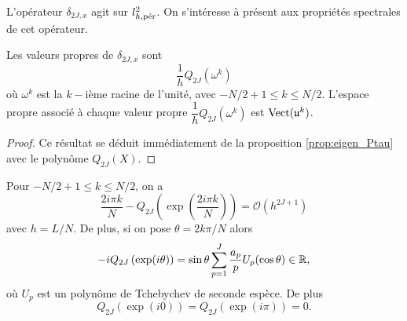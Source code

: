L'opérateur $\delta_{2J,x}$ agit sur $l^2_{h,\per}$. On s'intéresse à présent aux propriétés spectrales de cet opérateur.
\begin{proposition}
Les valeurs propres de $\delta_{2J,x}$ sont
\begin{equation}
\dfrac{1}{h}Q_{2J}(\omega^k)
\end{equation}
où $\omega^k$ est la $k-$ième racine de l'unité, avec $-N/2+1 \leq k \leq N/2$. L'espace propre associé à chaque valeur propre $\dfrac{1}{h}Q_{2J}(\omega^k)$ est $\Vect ( \mathfrak{u}^k )$.
\label{prop:delta_x_spectre}
\end{proposition}

\begin{proof}
Ce résultat se déduit immédiatement de la proposition \ref{prop:eigen_Ptau} avec le polynôme $Q_{2J}(X)$.
\end{proof}

\begin{proposition}
Pour $-N/2+1 \leq k \leq N/2$, on a 
\begin{equation}
\dfrac{2 i \pi k}{N} - Q_{2J} \left( \exp \left( \dfrac{2 i \pi k}{N} \right) \right) = \mathcal{O}(h^{2J+1})
\end{equation}
avec $h=L/N$.
De plus, si on pose $\theta= 2 k \pi / N$ alors 
\begin{equation}
-i Q_{2J} \left( \exp ( i \theta ) \right) = \sin \theta \gsum_{p=1}^J \dfrac{a_p}{p} U_p (\cos \theta)\in \mathbb{R},
\end{equation}
où $U_p$ est un polynôme de Tchebychev de seconde espèce. De plus 
\begin{equation}
Q_{2J} \left( \exp ( i 0 ) \right) = Q_{2J} \left( \exp ( i \pi ) \right) = 0.
\end{equation}
\label{prop:freq_pol_classique1}
\end{proposition}

